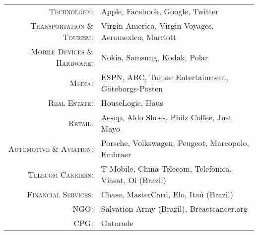 \documentclass[a4paper,10pt]{article}
\begin{document}
\begin{tabular}{rl}
  \textsc{Technology:} &
    Apple,
    Facebook,
    Google,
    Twitter \\

  \textsc{Transportation \& Tourism:} &
    Virgin America,
    Virgin Voyages,
    Aeromexico,
    Marriott \\

  \textsc{Mobile Devices \& Hardware:} &

    Nokia,
    Samsung,
    Kodak,
    Polar \\

  \textsc{Media:} &

    ESPN,
    ABC,
    Turner Entertainment,
    G\"{o}teborgs-Posten \\

  \textsc{Real Estate:} &

    HouseLogic,
    Haus\\

  \textsc{Retail:} &

    Aesop,
    Aldo Shoes,
    Philz Coffee,
    Just Mayo\\

  \textsc{Automotive \& Aviation:} &

    Porsche,
    Volkswagen,
    Peugeot,
    Marcopolo,
    Embraer\\

  \textsc{Telecom Carriers:} &

    T-Mobile,
    China Telecom,
    Telef\'{o}nica,
    Viasat,
    Oi (Brazil)\\

  \textsc{Financial Services:} &

    Chase,
    MasterCard,
    Elo,
    Ita\'{u} (Brazil)\\

  \textsc{NGO:} &

    Salvation Army (Brazil),
    Breastcancer.org\\
    
  \textsc{CPG:} &

  Gatorade
  
\end{tabular}
\end{document}
